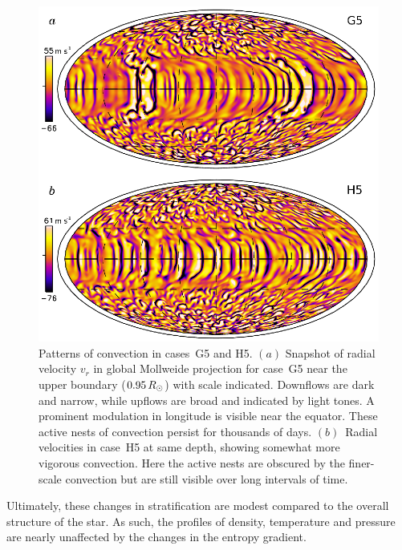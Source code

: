 \begin{figure}[!p]
  \begin{center}
    \includegraphics[width=0.8\linewidth]{figs/chapter_2/five_solar_hydro_cases.eps}
  \end{center}
  \caption[Patterns of convection in cases~G5 and H5]
	  {Patterns of convection in cases~G5 and H5.  $(a)$ Snapshot
	  of radial velocity $v_r$ in global Mollweide projection for case~G5
	  near the upper boundary ($0.95 \thinspace R_\odot$) with scale
	  indicated.  Downflows are dark and narrow, while upflows are
	  broad and indicated by light tones. A prominent modulation
	  in longitude is visible near the equator.  These active
	  nests of convection persist for thousands of days.
	  $(b)$~Radial velocities in case~H5 at same depth, showing somewhat more vigorous
	  convection.  Here the active nests are obscured by the
	  finer-scale convection but are still visible over long
	  intervals of time.
	  \label{fig:five_solar_hydro_cases}}
\end{figure}




Ultimately, these changes in stratification are modest compared to the
overall structure of the star. As such, the profiles of density,
temperature and pressure are nearly unaffected by the changes in the
entropy gradient.

